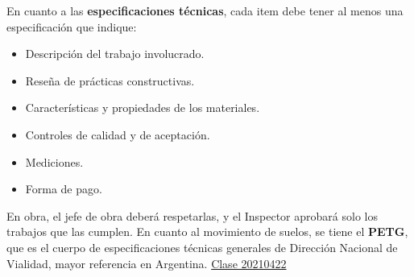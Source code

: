 \documentclass[../main.tex]{subfiles}
\begin{document}
En cuanto a las \textbf{especificaciones técnicas}, cada item debe tener al
menos una especificación que indique:

\begin{itemize}
  \item Descripción del trabajo involucrado.
  \item Reseña de prácticas constructivas.
  \item Características y propiedades de los materiales.
  \item Controles de calidad y de aceptación.
  \item Mediciones.
  \item Forma de pago.
\end{itemize}

En obra, el jefe de obra deberá respetarlas, y el Inspector aprobará solo los
trabajos que las cumplen. En cuanto al movimiento de suelos, se tiene el
\textbf{PETG}, que es el cuerpo de especificaciones técnicas generales de 
Dirección Nacional de Vialidad, mayor referencia en Argentina.
\href{https://youtu.be/zlrogWSgd9k}{Clase 20210422}
\end{document}

